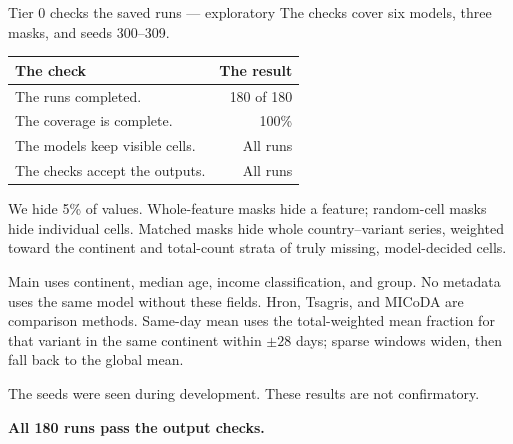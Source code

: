 \begin{frame}{Tier 0 checks the saved runs --- exploratory}
\fontsize{9}{11}\selectfont
The checks cover six models, three masks, and seeds 300--309.
\par\medskip
\begin{center}\begin{tabular}{lr}\hline
The check & The result \\\hline
The runs completed. & 180 of 180 \\
The coverage is complete. & 100\% \\
The models keep visible cells. & All runs \\
The checks accept the outputs. & All runs \\
\hline\end{tabular}\end{center}We hide 5\% of values. Whole-feature masks hide a feature; random-cell masks hide individual cells. Matched masks hide whole country--variant series, weighted toward the continent and total-count strata of truly missing, model-decided cells.\par\medskip Main uses continent, median age, income classification, and group. No metadata uses the same model without these fields. Hron, Tsagris, and MICoDA are comparison methods. Same-day mean uses the total-weighted mean fraction for that variant in the same continent within $\pm28$ days; sparse windows widen, then fall back to the global mean.\par\medskip The seeds were seen during development. These results are not confirmatory.
\par\medskip
\textbf{All 180 runs pass the output checks.}
\end{frame}
